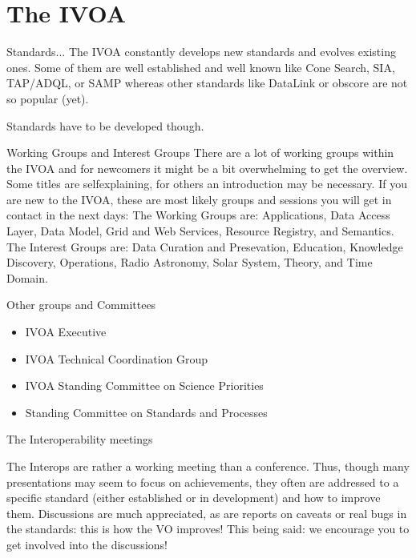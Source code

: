 \documentclass{beamer}
\begin{document}
\section{The IVOA}

\begin{frame}{Standards...}
The IVOA constantly develops new standards and evolves existing ones.
Some of them are well established and well known like Cone Search, SIA,
TAP/ADQL, or SAMP whereas other standards like DataLink or obscore are
not so popular (yet). 

Standards have to be developed though. 

\end{frame}

\begin{frame}{Working Groups and Interest Groups}
There are a lot of working groups within the IVOA and for newcomers it
might be a bit overwhelming to get the overview. Some titles are
selfexplaining, for others an introduction may be necessary. If you are
new to the IVOA, these are most likely groups and sessions you will get
in contact in the next days:
\newline
\newline
The Working Groups are: Applications, Data Access Layer, Data Model,
Grid and Web Services, Resource Registry, and Semantics.
\newline
\newline
The Interest Groups are: Data Curation and Presevation, Education,
Knowledge Discovery, Operations, Radio Astronomy, Solar System, Theory,
and Time Domain.
\end{frame}

 
\begin{frame}{Other groups and Committees}
\begin{itemize}
\item IVOA Executive
\item IVOA Technical Coordination Group
\item IVOA Standing Committee on Science Priorities
\item Standing Committee on Standards and Processes 
\end{itemize}

\end{frame}


\begin{frame}{The Interoperability meetings}

The Interops are rather a working meeting than a conference. Thus,
though many presentations may seem to focus on achievements, they often
are addressed to a specific standard (either established or in
development) and how to improve them. Discussions are much appreciated,
as are reports on caveats or real bugs in the standards: this is how the
VO improves! \newline
\newline
This being said: we encourage you to get involved into the discussions! 


\end{frame}
\end{document}
